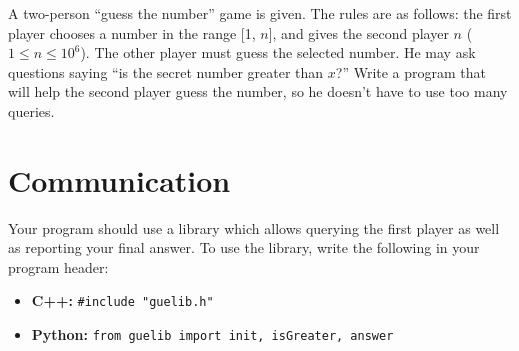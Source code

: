 \documentclass{spiral}
\begin{document}
    \makeheader

    A two-person ``guess the number'' game is given.
    The rules are as follows:
    the first player chooses a number in the range [1, $n$],
    and gives the second player $n$ ($1 \leq n \leq 10^6$).
    The other player must guess the selected number. 
    He may ask questions saying ``is the secret number greater than $x$?''
    Write a program that will help the second player guess the number,
    so he doesn't have to use too many queries.

\section{Communication}

    Your program should use a library which allows querying the first player
    as well as reporting your final answer.
    To use the library, write the following in your program header:
    \begin{itemize}
        \item \textbf{C++:}
            \verb|#include "guelib.h"|

        \item \textbf{Python:}
            \texttt{from guelib import init, isGreater, answer}
    \end{itemize}
\end{document}
